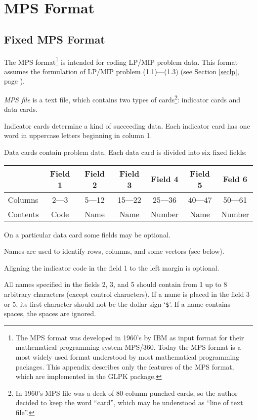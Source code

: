 
\chapter{MPS Format}
\label{champs}

\section{Fixed MPS Format}
\label{secmps}

The MPS format\footnote{The MPS format was developed in 1960's by IBM
as input format for their mathematical programming system MPS/360.
Today the MPS format is a most widely used format understood by most
mathematical programming packages. This appendix describes only the
features of the MPS format, which are implemented in the GLPK package.}
is intended for coding LP/MIP problem data. This format assumes the
formulation of LP/MIP problem (1.1)---(1.3) (see Section \ref{seclp},
page \pageref{seclp}).

{\it MPS file} is a text file, which contains two types of
cards\footnote{In 1960's MPS file was a deck of 80-column punched cards,
so the author decided to keep the word ``card'', which may be understood
as ``line of text file''.}: indicator cards and data cards.

Indicator cards determine a kind of succeeding data. Each indicator card
has one word in uppercase letters beginning in column 1.

Data cards contain problem data. Each data card is divided into six
fixed fields:

\begin{center}
\begin{tabular}{lcccccc}
& Field 1 & Field 2 & Field 3 & Field 4 & Field 5 & Feld 6 \\
\hline
Columns & 2---3 & 5---12 & 15---22 & 25---36 & 40---47 & 50---61 \\
Contents & Code & Name & Name & Number & Name & Number \\
\end{tabular}
\end{center}

On a particular data card some fields may be optional.

Names are used to identify rows, columns, and some vectors (see below).

Aligning the indicator code in the field 1 to the left margin is
optional.

All names specified in the fields 2, 3, and 5 should contain from 1 up
to 8 arbitrary characters (except control characters). If a name is
placed in the field 3 or 5, its first character should not be the dollar
sign `\verb|$|'. If a name contains spaces, the spaces are ignored.

